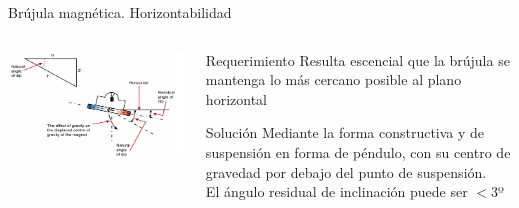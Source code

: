 \begin{frame}{  Br\'ujula magn\'etica. Horizontabilidad }

  \begin{columns}

    \begin{column}{0.65\textwidth}
      \includegraphics[width=\linewidth]{05.instrumentos.giroscopicos.imagenes/05.04.MagnetismoTerrestre/05-04-brujula_magnetica_inclinacione.png}
    \end{column}
    
    \begin{column}{0.4\textwidth}

    \begin{alertblock}{Requerimiento}
      Resulta escencial que la br\'ujula se mantenga lo m\'as cercano posible al plano horizontal
    \end{alertblock}

    \begin{exampleblock}{Soluci\'on}
      Mediante la forma constructiva y de suspensi\'on en forma de p\'endulo, con su centro de gravedad
      por debajo del punto de suspensi\'on.\\
      El \'angulo residual de inclinaci\'on puede ser $< 3$º
    \end{exampleblock}

    \end{column}
    
  \end{columns}




\end{frame}

